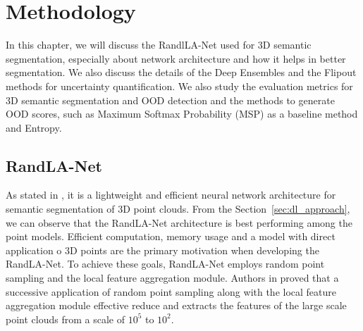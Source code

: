 
\chapter{Methodology}
\label{chapter:methodology}
In this chapter, we will discuss the RandlLA-Net used for 3D semantic segmentation, especially about network architecture and how it helps in better segmentation.
We also discuss the details of the Deep Ensembles and the Flipout methods for uncertainty quantification.
We also study the evaluation metrics for 3D semantic segmentation and OOD detection and the methods to generate OOD scores, such as Maximum Softmax Probability (MSP) as a baseline method and Entropy.
\section{RandLA-Net}
\label{sec:meth_randla}
As stated in \cite{Hu_2020_CVPR_Randla}, it is a lightweight and efficient neural network architecture for semantic segmentation of 3D point clouds.
From the Section~\ref{sec:dl_approach}, we can observe that the RandLA-Net architecture is best performing among the point models.
Efficient computation, memory usage and a model with direct application o 3D points are the primary motivation when developing the RandLA-Net.
To achieve these goals, RandLA-Net employs random point sampling and the local feature aggregation module.
Authors in \cite{Hu_2020_CVPR_Randla} proved that a successive application of random point sampling along with the local feature aggregation module effective reduce and extracts the features of the large scale point clouds from a scale of $10^5$ to $10^2$.

